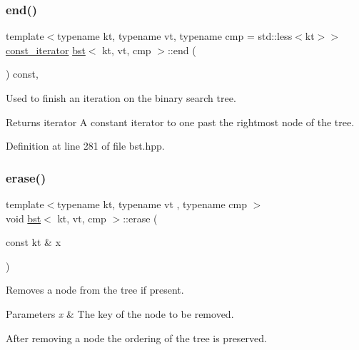 \subsubsection{\texorpdfstring{end()}{end()}\hspace{0.1cm}{\footnotesize\ttfamily [2/2]}}
{\footnotesize\ttfamily template$<$typename kt, typename vt, typename cmp = std\+::less$<$kt$>$$>$ \\
\hyperlink{classbst_a72485696d999bf489c6156f6327a2163}{const\+\_\+iterator} \hyperlink{classbst}{bst}$<$ kt, vt, cmp $>$\+::end (\begin{DoxyParamCaption}{ }\end{DoxyParamCaption}) const\hspace{0.3cm}{\ttfamily [inline]}, {\ttfamily [noexcept]}}



Used to finish an iteration on the binary search tree. 

\begin{DoxyReturn}{Returns}
iterator A constant iterator to one past the rightmost node of the tree. 
\end{DoxyReturn}


Definition at line 281 of file bst.\+hpp.

\mbox{\label{classbst_af5ed588b2c686b3b53a2b5466a617f73}} 
\subsubsection{\texorpdfstring{erase()}{erase()}}
{\footnotesize\ttfamily template$<$typename kt, typename vt , typename cmp $>$ \\
void \hyperlink{classbst}{bst}$<$ kt, vt, cmp $>$\+::erase (\begin{DoxyParamCaption}\item[{const kt \&}]{x }\end{DoxyParamCaption})\hspace{0.3cm}{\ttfamily [noexcept]}}



Removes a node from the tree if present. 


\begin{DoxyParams}{Parameters}
{\em x} & The key of the node to be removed.\\
\hline
\end{DoxyParams}
After removing a node the ordering of the tree is preserved. 

